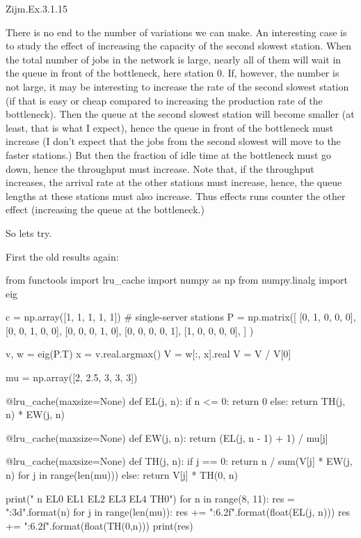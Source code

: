 \begin{exercise}
Zijm.Ex.3.1.15
\begin{solution}
  There is no end to the number of variations we can make. An
  interesting case is to study the effect of increasing the capacity
  of the second slowest station. When the total number of jobs in the
  network is large, nearly all of them will wait in the queue in front
  of the bottleneck, here station 0. If, however, the number is not
  large, it may be interesting to increase the rate of the second
  slowest station (if that is easy or cheap compared to increasing the
  production rate of the bottleneck). Then the queue at the second
  slowest station will become smaller (at least, that is what I
  expect), hence the queue in front of the bottleneck must increase (I
  don't expect that the jobs from the second slowest will move to the
  faster stations.)  But then the fraction of idle time at the
  bottleneck must go down, hence the throughput must increase. Note
  that, if the throughput increases, the arrival rate at the other
  stations must increase, hence, the queue lengths at these stations
  must also increase. Thus effects runs counter the other effect
  (increasing the queue at the bottleneck.)

  So lets try.

First the old results again:

\begin{pyconsole}
from functools import lru_cache
import numpy as np
from numpy.linalg import eig


c = np.array([1, 1, 1, 1, 1])  # single-server stations
P = np.matrix([
    [0, 1, 0, 0, 0],
    [0, 0, 1, 0, 0],
    [0, 0, 0, 1, 0],
    [0, 0, 0, 0, 1],
    [1, 0, 0, 0, 0],
]
)

v, w = eig(P.T)
x = v.real.argmax()
V = w[:, x].real
V = V / V[0]

mu = np.array([2, 2.5, 3, 3, 3])

@lru_cache(maxsize=None)
def EL(j, n):
    if n <= 0:
        return 0
    else:
        return TH(j, n) * EW(j, n)

@lru_cache(maxsize=None)
def EW(j, n):
    return (EL(j, n - 1) + 1) / mu[j]


@lru_cache(maxsize=None)
def TH(j, n):
    if j == 0:
        return n / sum(V[j] * EW(j, n) for j in range(len(mu)))
    else:
        return V[j] * TH(0, n)

print(" n  EL0  EL1  EL2   EL3   EL4 TH0")
for n in range(8, 11):
    res = "{:3d}".format(n)
    for j in range(len(mu)):
        res += "{:6.2f}".format(float(EL(j, n)))
    res += "{:6.2f}".format(float(TH(0,n)))
    print(res)
  

\end{pyconsole}
\end{solution}
\end{exercise}
